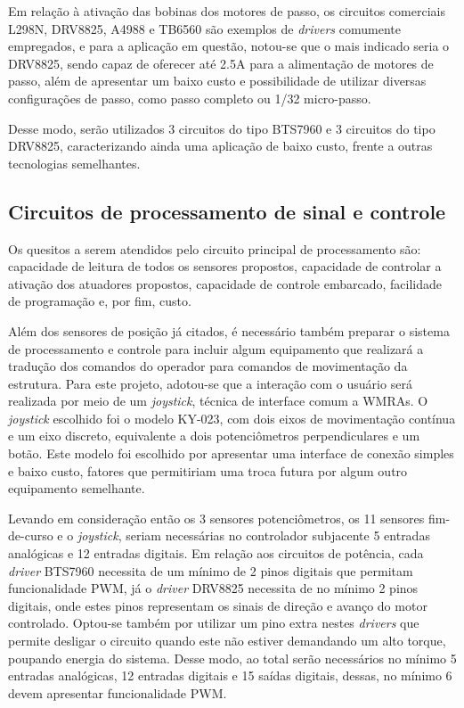 Em relação à ativação das bobinas dos motores de passo, os circuitos 
comerciais L298N, DRV8825, A4988 e TB6560 são exemplos de \textit{drivers}
comumente empregados, e para a aplicação em questão, notou-se que o mais indicado seria 
o DRV8825, sendo capaz de oferecer até 2.5A para a alimentação de motores 
de passo, além de apresentar um baixo custo e possibilidade de utilizar
diversas configurações de passo, como passo completo ou 1/32 micro-passo. 

Desse modo, serão utilizados 3 circuitos do tipo BTS7960 e 3 circuitos do 
tipo DRV8825, caracterizando ainda uma aplicação de baixo custo, frente a 
outras tecnologias semelhantes.

\subsection{Circuitos de processamento de sinal e controle}

Os quesitos a serem atendidos pelo circuito principal de processamento são: 
capacidade de leitura de todos os sensores propostos, capacidade de 
controlar a ativação dos atuadores propostos, capacidade de controle 
embarcado, facilidade de programação e, por fim, custo.

Além dos sensores de posição já citados, é necessário também preparar o 
sistema de processamento e controle para incluir algum equipamento que realizará
a tradução dos comandos do operador para comandos de movimentação da estrutura.
Para este projeto, adotou-se que a interação com o usuário será realizada por 
meio de um \textit{joystick}, técnica de interface comum a WMRAs.
O \textit{joystick} escolhido foi o modelo KY-023, 
com dois eixos de movimentação contínua e um eixo discreto, 
equivalente a dois potenciômetros perpendiculares e um botão. Este modelo 
foi escolhido por apresentar uma interface de conexão simples e baixo custo,
fatores que permitiriam uma troca futura por algum outro equipamento semelhante.

Levando em consideração então os 3 sensores potenciômetros, os 11 sensores 
fim-de-curso e o \textit{joystick}, seriam necessárias no controlador subjacente 
5 entradas analógicas e 12 entradas digitais. 
Em relação aos circuitos de potência, cada \textit{driver} BTS7960 necessita de um 
mínimo de 2 pinos digitais que permitam funcionalidade PWM, 
já o \textit{driver} DRV8825 necessita de no mínimo 2 pinos digitais, onde estes pinos 
representam os sinais de direção e avanço do motor controlado. 
Optou-se também por utilizar um pino extra nestes \textit{drivers} que permite 
desligar o circuito quando este não estiver demandando um alto torque, poupando energia do sistema. 
Desse modo, ao total serão necessários no mínimo 5 entradas 
analógicas, 12 entradas digitais e 15 saídas digitais,
dessas, no mínimo 6 devem apresentar funcionalidade PWM.  

